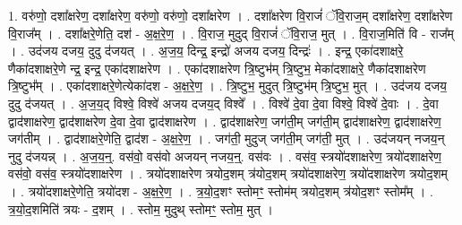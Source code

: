 \documentclass[17pt]{extarticle}
\begin{document}
1. वरु॑णो॒ दशा᳚क्षरेण॒ दशा᳚क्षरेण॒ वरु॑णो॒ वरु॑णो॒ दशा᳚क्षरेण । . दशा᳚क्षरेण वि॒राजं॑ ॅवि॒राज॒म् दशा᳚क्षरेण॒ दशा᳚क्षरेण वि॒राज᳚म् । . दशा᳚क्षरे॒णेति॒ दश॑ - अ॒क्ष॒रे॒ण॒ । . वि॒राज॒ मुदुद् वि॒राजं॑ ॅवि॒राज॒ मुत् । . वि॒राज॒मिति॑ वि - राज᳚म् । . उद॑जय दजय॒ दुदु द॑जयत् । . अ॒ज॒य॒ दिन्द्र॒ इन्द्रो॑ अजय दजय॒ दिन्द्रः॑ । . इन्द्र॒ एका॑दशाक्षरे॒ णैका॑दशाक्षरे॒णे न्द्र॒ इन्द्र॒ एका॑दशाक्षरेण । . एका॑दशाक्षरेण त्रि॒ष्टुभ॑म् त्रि॒ष्टुभ॒ मेका॑दशाक्षरे॒ णैका॑दशाक्षरेण त्रि॒ष्टुभ᳚म् । . एका॑दशाक्षरे॒णेत्येका॑दश - अ॒क्ष॒रे॒ण॒ । . त्रि॒ष्टुभ॒ मुदुत् त्रि॒ष्टुभ॑म् त्रि॒ष्टुभ॒ मुत् । . उद॑जय दजय॒ दुदु द॑जयत् । . अ॒ज॒य॒द् विश्वे॒ विश्वे॑ अजय दजय॒द् विश्वे᳚ । . विश्वे॑ दे॒वा दे॒वा विश्वे॒ विश्वे॑ दे॒वाः । . दे॒वा द्वाद॑शाक्षरेण॒ द्वाद॑शाक्षरेण दे॒वा दे॒वा द्वाद॑शाक्षरेण । . द्वाद॑शाक्षरेण॒ जग॑ती॒म् जग॑ती॒म् द्वाद॑शाक्षरेण॒ द्वाद॑शाक्षरेण॒ जग॑तीम् । . द्वाद॑शाक्षरे॒णेति॒ द्वाद॑श - अ॒क्ष॒रे॒ण॒ । . जग॑ती॒ मुदुज् जग॑ती॒म् जग॑ती॒ मुत् । . उद॑जयन् नजय॒न् नुदु द॑जयन्न् । . अ॒ज॒य॒न्॒. वस॑वो॒ वस॑वो अजयन् नजय॒न्॒. वस॑वः । . वस॑व॒ स्त्रयो॑दशाक्षरेण॒ त्रयो॑दशाक्षरेण॒ वस॑वो॒ वस॑व॒ स्त्रयो॑दशाक्षरेण । . त्रयो॑दशाक्षरेण त्रयोद॒शम् त्र॑योद॒शम् त्रयो॑दशाक्षरेण॒ त्रयो॑दशाक्षरेण त्रयोद॒शम् । . त्रयो॑दशाक्षरे॒णेति॒ त्रयो॑दश - अ॒क्ष॒रे॒ण॒ । . त्र॒यो॒द॒शꣳ स्तोमꣳ॒॒ स्तोम॑म् त्रयोद॒शम् त्र॑योद॒शꣳ स्तोम᳚म् । . त्र॒यो॒द॒शमिति॑ त्रयः - द॒शम् । . स्तोम॒ मुदुथ् स्तोमꣳ॒॒ स्तोम॒ मुत् । \newline
\end{document}
